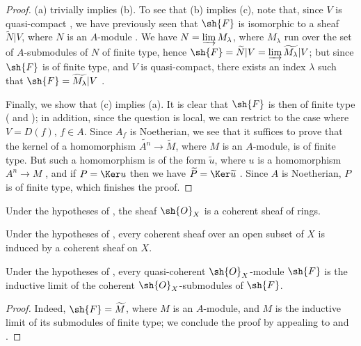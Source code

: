 \begin{proof}
(a) trivially implies (b).
To see that (b) implies (c), note that, since $V$ is quasi-compact , we have previously seen that $\sh{F}$ is isomorphic to a sheaf $\widetilde{N}|V$, where $N$ is an $A$-module .
We have $N=\varinjlim M_\lambda$, where $M_\lambda$ run over the set of $A$-submodules of $N$ of finite type, hence  $\sh{F}=\widetilde{N}|V=\varinjlim\widetilde{M_\lambda}|V$;
but since $\sh{F}$ is of finite type, and $V$ is quasi-compact, there exists an index $\lambda$ such that $\sh{F}=\widetilde{M_\lambda}|V$ .

Finally, we show that (c) implies (a).
It is clear that $\sh{F}$ is then of finite type ( and );
in addition, since the question is local, we can restrict to the case where $V=D(f)$, $f\in A$.
Since $A_f$ is Noetherian, we see that it suffices to prove that the kernel of a homomorphism $\widetilde{A^n}\to\widetilde{M}$, where $M$ is an $A$-module, is of finite type.
But such a homomorphism is of the form $\widetilde{u}$, where $u$ is a homomorphism $A^n\to M$ , and if $P=\Ker u$ then we have $\widetilde{P}=\Ker\widetilde{u}$ .
Since $A$ is Noetherian, $P$ is of finite type, which finishes the proof.
\end{proof}

\begin{corollary}[1.5.2]
\label{I.1.5.2}
Under the hypotheses of , the sheaf $\sh{O}_X$ is a coherent sheaf of rings.
\end{corollary}

\begin{corollary}[1.5.3]
\label{I.1.5.3}
Under the hypotheses of , every coherent sheaf over an open subset of $X$ is induced by a coherent sheaf on $X$.
\end{corollary}

\begin{corollary}[1.5.4]
\label{I.1.5.4}
Under the hypotheses of , every quasi-coherent $\sh{O}_X$-module $\sh{F}$ is the inductive limit of the coherent $\sh{O}_X$-submodules of $\sh{F}$.
\end{corollary}

\begin{proof}
Indeed, $\sh{F}=\widetilde{M}$, where $M$ is an $A$-module, and $M$ is the inductive limit of its submodules of finite type;
we conclude the proof by appealing to  and .
\end{proof}

